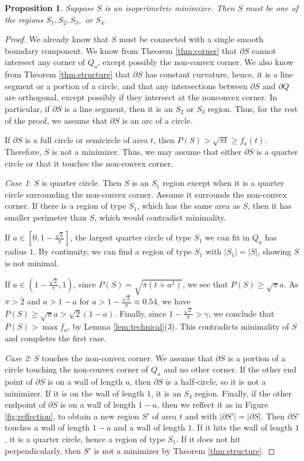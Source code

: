 \documentclass[leqno]{article}
\numberwithin{equation}{section}
\theoremstyle{definition}
\theoremstyle{remark}
\theoremstyle{plain}
\newtheorem{proposition}[equation]{Proposition}
\begin{document}
\begin{proposition}\label{prop:ruleoutlots}Suppose $S$ is an isoperimetric minimizer.  Then $S$ must be one of the regions $S_1,S_2,S_3,$ or $S_4$.
\end{proposition}

\begin{proof}We already know that $S$ must be connected with a single smooth boundary component.  We know from Theorem \ref{thm:corner} that $\partial S$ cannot intersect any corner of $Q_a$, except possibly the non-convex corner.  We also know from Theorem \ref{thm:structure} that $\partial S$ has constant curvature, hence, it is a line segment or a portion of a circle, and that any intersections between $\partial S$ and $\partial Q$ are orthogonal, except possibly if they intersect at the nonconvex corner.   In particular, if $\partial S$ is a line segment, then it is an $S_2$ or $S_3$ region. Thus, for the rest of the proof, we assume that $\partial S$ is an arc of a circle.

If $\partial S$ is a full circle or semicircle of area $t$, then $P(S) > \sqrt{\pi t} \geq f_a(t)$. Therefore, $S$ is not a minimizer. Thus, we may assume that either $\partial S$ is a quarter circle or that it touches the non-convex corner.

\textit{Case 1}:  $S$ is quarter circle.  Then $S$ is an $S_1$ region except when it is a quarter circle surrounding the non-convex corner. Assume it surrounds the non-convex corner. If there is a region of type $S_1$, which has the same area as $S$, then it has smaller perimeter than $S$, which would contradict minimality.  

If $a\in \left[0, 1 - \frac{\sqrt{2}}{\pi}\right]$, the largest quarter circle of type $S_1$ we can fit in $Q_a$ has radius $1$. By continuity, we can find a region of type $S_1$ with $|S_1| = |S|$, showing $S$ is not minimal.

If $a\in \left(1 - \frac{\sqrt{2}}{\pi},1\right)$, since $P(S) = \sqrt{\pi(t + a^2)}$, we see that $P(S)\geq \sqrt{\pi}a$. As $\pi > 2$ and $a > 1-a$ for $a > 1-\frac{\sqrt{2}}{\pi} \approx 0.54$, we have $P(S) \geq \sqrt{\pi} a > \sqrt{2} (1-a)$.  Finally, since $1-\frac{\sqrt{2}}{\pi} > \gamma$, we conclude that $P(S) >   \max f_a$, by Lemma \ref{lem:technical}(3). This contradicts minimality of $S$ and completes the first case.

\textit{Case 2}:  $S$ touches the non-convex corner.  We assume that $\partial S$ is a portion of a circle touching the non-convex corner of $Q_a$ and no other corner.  If the other end point of $\partial S$ is on a wall of length $a$, then $\partial S$ is a half-circle, so it is not a minimizer.  If it is on the wall of length $1$, it is an $S_4$ region.  Finally, if the other endpoint of $\partial S$ is on a wall of length $1-a$, then we reflect it as in Figure \ref{fig:reflection}, to obtain a new region $S'$ of area $t$ and with $|\partial S'| = |\partial S|$.  Then $\partial S'$ touches a wall of length $1-a$ and a wall of length $1$.  If it hits the wall of length $1$, it is a quarter circle, hence a region of type $S_1$.  If it does not hit perpendicularly, then $S'$ is not a minimizer by Theorem \ref{thm:structure}.


\end{proof}
\end{document}
